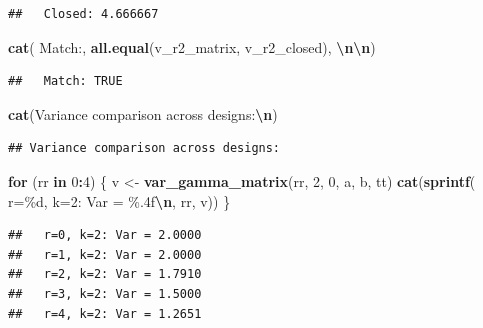 \documentclass[
  11pt,
]{article}
\newenvironment{Shaded}{\begin{snugshade}}{\end{snugshade}}
\newcommand{\ControlFlowTok}[1]{\textcolor[rgb]{0.13,0.29,0.53}{\textbf{#1}}}
\newcommand{\DecValTok}[1]{\textcolor[rgb]{0.00,0.00,0.81}{#1}}
\newcommand{\FunctionTok}[1]{\textcolor[rgb]{0.13,0.29,0.53}{\textbf{#1}}}
\newcommand{\NormalTok}[1]{#1}
\newcommand{\OtherTok}[1]{\textcolor[rgb]{0.56,0.35,0.01}{#1}}
\newcommand{\SpecialCharTok}[1]{\textcolor[rgb]{0.81,0.36,0.00}{\textbf{#1}}}
\newcommand{\StringTok}[1]{\textcolor[rgb]{0.31,0.60,0.02}{#1}}
\begin{document}
\begin{verbatim}
##   Closed: 4.666667
\end{verbatim}

\begin{Shaded}
\begin{Highlighting}[]
\FunctionTok{cat}\NormalTok{(}\StringTok{\textquotesingle{}  Match:\textquotesingle{}}\NormalTok{,}
    \FunctionTok{all.equal}\NormalTok{(v\_r2\_matrix, v\_r2\_closed), }\StringTok{\textquotesingle{}}\SpecialCharTok{\textbackslash{}n\textbackslash{}n}\StringTok{\textquotesingle{}}\NormalTok{)}
\end{Highlighting}
\end{Shaded}

\begin{verbatim}
##   Match: TRUE
\end{verbatim}

\begin{Shaded}
\begin{Highlighting}[]
\FunctionTok{cat}\NormalTok{(}\StringTok{\textquotesingle{}Variance comparison across designs:}\SpecialCharTok{\textbackslash{}n}\StringTok{\textquotesingle{}}\NormalTok{)}
\end{Highlighting}
\end{Shaded}

\begin{verbatim}
## Variance comparison across designs:
\end{verbatim}

\begin{Shaded}
\begin{Highlighting}[]
\ControlFlowTok{for}\NormalTok{ (rr }\ControlFlowTok{in} \DecValTok{0}\SpecialCharTok{:}\DecValTok{4}\NormalTok{) \{}
\NormalTok{  v }\OtherTok{\textless{}{-}} \FunctionTok{var\_gamma\_matrix}\NormalTok{(rr, }\DecValTok{2}\NormalTok{, }\DecValTok{0}\NormalTok{, a, b, tt)}
  \FunctionTok{cat}\NormalTok{(}\FunctionTok{sprintf}\NormalTok{(}\StringTok{\textquotesingle{}  r=\%d, k=2: Var = \%.4f}\SpecialCharTok{\textbackslash{}n}\StringTok{\textquotesingle{}}\NormalTok{, rr, v))}
\NormalTok{\}}
\end{Highlighting}
\end{Shaded}

\begin{verbatim}
##   r=0, k=2: Var = 2.0000
##   r=1, k=2: Var = 2.0000
##   r=2, k=2: Var = 1.7910
##   r=3, k=2: Var = 1.5000
##   r=4, k=2: Var = 1.2651
\end{verbatim}
\end{document}
